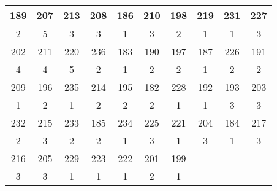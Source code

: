 \begin{tabular}{|c|c|c|c|c|c|c|c|c|c|}
    \hline
    189 & 207 & 213 & 208 & 186 & 210 & 198 & 219 & 231 & 227\\
    \hline
    2 & 5 & 3 & 3 & 1 & 3 & 2 & 1 & 1 & 3\\
    \hline
    [1ex]
    \hline
    202 & 211 & 220 & 236 & 183 & 190 & 197 & 187 & 226 & 191\\
    \hline
    4 & 4 & 5 & 2 & 1 & 2 & 2 & 1 & 2 & 2\\
    \hline
    [1ex]
    \hline
    209 & 196 & 235 & 214 & 195 & 182 & 228 & 192 & 193 & 203\\
    \hline
    1 & 2 & 1 & 2 & 2 & 2 & 1 & 1 & 3 & 3\\
    \hline
    [1ex]
    \hline
    232 & 215 & 233 & 185 & 234 & 225 & 221 & 204 & 184 & 217\\
    \hline
    2 & 3 & 2 & 2 & 1 & 3 & 1 & 3 & 1 & 3\\
    \hline
    [1ex]
    \hline
    216 & 205 & 229 & 223 & 222 & 201 & 199\\
    \hline
    3 & 3 & 1 & 1 & 1 & 2 & 1\\
    \hline
    [1ex]
\end{tabular}
